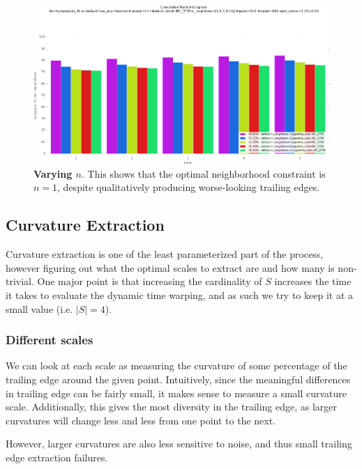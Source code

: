 \begin{figure}[t]%
\centering
\includegraphics[width=1\textwidth]{../images/results/vary_neighbors.png}
\caption{\textbf{Varying $n$}. This shows that the optimal neighborhood constraint is $n = 1$, despite qualitatively producing worse-looking trailing edges.}
\label{fig:vary_neighbors}
\end{figure}



\subsection{Curvature Extraction}

Curvature extraction is one of the least parameterized part of the process, however figuring out what the optimal scales to extract are and how many is non-trivial.
One major point is that increasing the cardinality of $S$ increases the time it takes to evaluate the dynamic time warping, and as such we try to keep it at a small value (i.e. $|S| = 4$).

\subsubsection{Different scales}

We can look at each scale as measuring the curvature of some percentage of the trailing edge around the given point.
Intuitively, since the meaningful differences in trailing edge can be fairly small, it makes sense to measure a small curvature scale.
Additionally, this gives the most diversity in the trailing edge, as larger curvatures will change less and less from one point to the next.

However, larger curvatures are also less sensitive to noise, and thus small trailing edge extraction failures.


